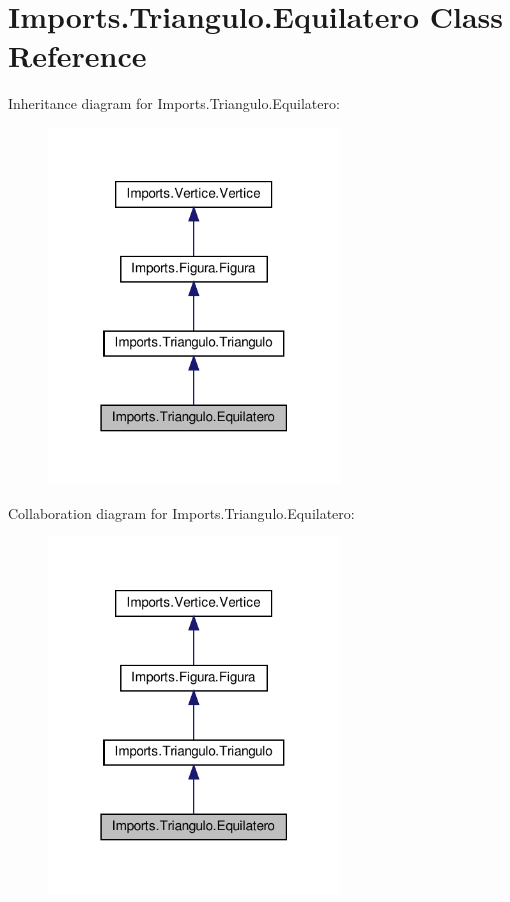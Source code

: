 \hypertarget{class_imports_1_1_triangulo_1_1_equilatero}{}\section{Imports.\+Triangulo.\+Equilatero Class Reference}
\label{class_imports_1_1_triangulo_1_1_equilatero}


Inheritance diagram for Imports.\+Triangulo.\+Equilatero\+:
\nopagebreak
\begin{figure}[H]
\begin{center}
\leavevmode
\includegraphics[width=219pt]{class_imports_1_1_triangulo_1_1_equilatero__inherit__graph}
\end{center}
\end{figure}


Collaboration diagram for Imports.\+Triangulo.\+Equilatero\+:
\nopagebreak
\begin{figure}[H]
\begin{center}
\leavevmode
\includegraphics[width=219pt]{class_imports_1_1_triangulo_1_1_equilatero__coll__graph}
\end{center}
\end{figure}
